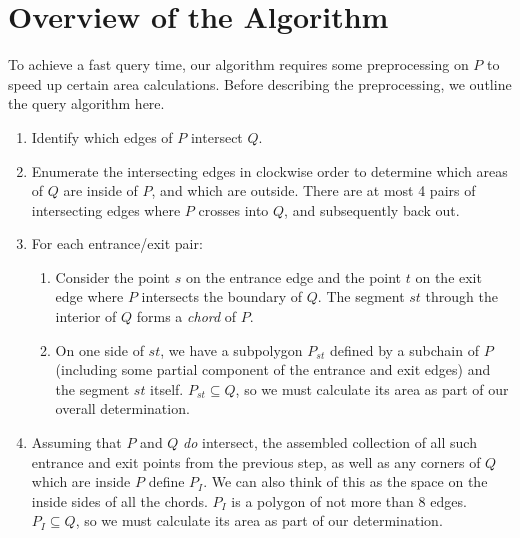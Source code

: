 \section{Overview of the Algorithm}
\label{:convexp:approach}

To achieve a fast query time, our algorithm requires some preprocessing on $P$ to speed up certain area calculations. Before describing the preprocessing, we outline the query algorithm here.

\begin{enumerate}
 \item Identify which edges of $P$ intersect $Q$.
 
 \item Enumerate the intersecting edges in clockwise order to determine which areas of $Q$ are inside of $P$, and which are outside. There are at most 4 pairs of intersecting edges where $P$ crosses into $Q$, and subsequently back out.
 
 \item For each entrance/exit pair:
 \begin{enumerate}
  \item Consider the point $s$ on the entrance edge and the point $t$ on the exit edge where $P$ intersects the boundary of $Q$. The segment $st$  through the interior of $Q$ forms a \emph{chord} of $P$.
  
  \item On one side of $st$, we have a subpolygon $P_{st}$ defined by a subchain of $P$ (including some partial component of the entrance and exit edges) and the segment $st$ itself. $P_{st} \subseteq Q$, so we must calculate its area as part of our overall determination.
  
 \end{enumerate}

 \item Assuming that $P$ and $Q$ \emph{do} intersect, the assembled collection of all such entrance and exit points from the previous step, as well as any corners of $Q$ which are inside $P$ define $P_I$. We can also think of this as the space on the inside sides of all the chords. $P_I$ is a polygon of not more than 8 edges. $P_I \subseteq Q$, so we must calculate its area as part of our determination.
 
\end{enumerate}


